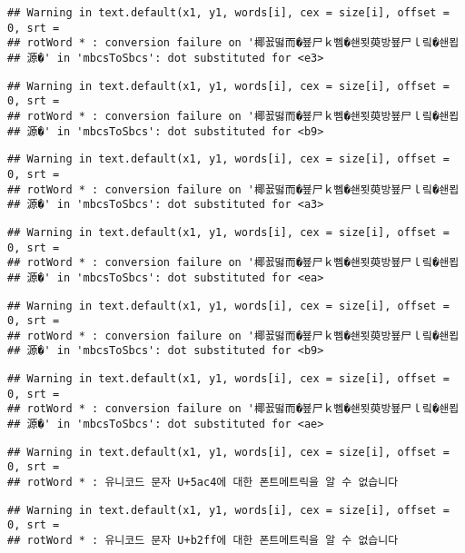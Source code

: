 \documentclass[]{article}
\begin{document}
\begin{verbatim}
## Warning in text.default(x1, y1, words[i], cex = size[i], offset = 0, srt =
## rotWord * : conversion failure on '椰꾨떯而�뵾尸ｋ뻼�쇈묏萸방뵾尸ｌ맄�쇈묍
## 源�' in 'mbcsToSbcs': dot substituted for <e3>
\end{verbatim}

\begin{verbatim}
## Warning in text.default(x1, y1, words[i], cex = size[i], offset = 0, srt =
## rotWord * : conversion failure on '椰꾨떯而�뵾尸ｋ뻼�쇈묏萸방뵾尸ｌ맄�쇈묍
## 源�' in 'mbcsToSbcs': dot substituted for <b9>
\end{verbatim}

\begin{verbatim}
## Warning in text.default(x1, y1, words[i], cex = size[i], offset = 0, srt =
## rotWord * : conversion failure on '椰꾨떯而�뵾尸ｋ뻼�쇈묏萸방뵾尸ｌ맄�쇈묍
## 源�' in 'mbcsToSbcs': dot substituted for <a3>
\end{verbatim}

\begin{verbatim}
## Warning in text.default(x1, y1, words[i], cex = size[i], offset = 0, srt =
## rotWord * : conversion failure on '椰꾨떯而�뵾尸ｋ뻼�쇈묏萸방뵾尸ｌ맄�쇈묍
## 源�' in 'mbcsToSbcs': dot substituted for <ea>
\end{verbatim}

\begin{verbatim}
## Warning in text.default(x1, y1, words[i], cex = size[i], offset = 0, srt =
## rotWord * : conversion failure on '椰꾨떯而�뵾尸ｋ뻼�쇈묏萸방뵾尸ｌ맄�쇈묍
## 源�' in 'mbcsToSbcs': dot substituted for <b9>
\end{verbatim}

\begin{verbatim}
## Warning in text.default(x1, y1, words[i], cex = size[i], offset = 0, srt =
## rotWord * : conversion failure on '椰꾨떯而�뵾尸ｋ뻼�쇈묏萸방뵾尸ｌ맄�쇈묍
## 源�' in 'mbcsToSbcs': dot substituted for <ae>
\end{verbatim}

\begin{verbatim}
## Warning in text.default(x1, y1, words[i], cex = size[i], offset = 0, srt =
## rotWord * : 유니코드 문자 U+5ac4에 대한 폰트메트릭을 알 수 없습니다
\end{verbatim}

\begin{verbatim}
## Warning in text.default(x1, y1, words[i], cex = size[i], offset = 0, srt =
## rotWord * : 유니코드 문자 U+b2ff에 대한 폰트메트릭을 알 수 없습니다
\end{verbatim}
\end{document}
